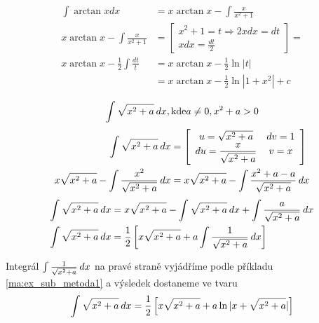 \begin{example}
    \begin{align*}
       \int{\arctan xdx}                      &= x\arctan x-\int\frac{x}{x^2+1}         \\
       x\arctan x-\int\frac{x}{x^2+1}         &= 
         \left[\begin{array}{c} 
                  x^2 + 1 = t  \Rightarrow 2xdx = dt        \\ 
                      xdx = \displaystyle{\frac{dt}{2}}
               \end{array} 
         \right] =                                                                    \\ 
       x\arctan x-\frac{1}{2}\int\frac{dt}{t} &= x\arctan x-\frac{1}{2}\ln|t|         \\
         &=   x\arctan x-\frac{1}{2}\ln|1+x^2|+ c                                     \\
    \end{align*}
    \begin{equation}\label{mai:exam016_003}
      \int{\sqrt{x^2+a}\hspace{2pt}dx}, \text{kde} a\neq0, x^2+a>0
    \end{equation}  
    \begin{align*}
      \int{\sqrt{x^2+a}\hspace{2pt}dx}                           &=
        \left[
          \begin{array}{cc} 
             u =\sqrt{x^2+a}              & dv = 1 \\ 
            du =\displaystyle
                  \frac{x}{\sqrt{x^2+a}}  &  v = x
          \end{array}
        \right]                                                                                   \\
      x\sqrt{x^2+a}-\int{\frac{x^2}{\sqrt{x^2+a}}\hspace{2pt}dx} &= 
        \displaystyle{x\sqrt{x^2+a}-\int{\frac{x^2+a-a}{\sqrt{x^2+a}}\hspace{2pt}dx}}                        
    \end{align*}\vspace*{-1em}
    \begin{align*}
      \int{\sqrt{x^2+a}\hspace{2pt}dx}                           &= 
        \displaystyle{x\sqrt{x^2+a}-\int{\sqrt{x^2+a}\hspace{2pt}dx} + \int{\frac{a}{\sqrt{x^2+a}}\hspace{2pt}dx}}      \\
      \int{\sqrt{x^2+a}\hspace{2pt}dx}                           &= 
        \frac{1}{2}\left[x\sqrt{x^2+a}+a\int{\frac{1}{\sqrt{x^2+a}}}\hspace{2pt}dx\right]
    \end{align*}
    
    Integrál \(\int\frac{1}{\sqrt{x^2+a}}\hspace{2pt}dx\) na pravé straně vyjádříme podle příkladu 
    \ref{ma:ex_sub_metoda1} a výsledek do\-sta\-ne\-me ve tvaru
    \begin{equation*}
      \int\displaystyle{{\sqrt{x^2+a}\hspace{2pt}dx}
         =\frac{1}{2}\left[x\sqrt{x^2+a}+a\ln{|x + \sqrt{x^2+a}|}\right]}
    \end{equation*}
  \end{example}
  
